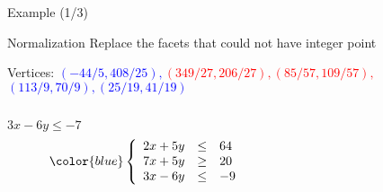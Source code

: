 \begin{frame}{Example (1/3)}
	\begin{block}{Normalization}
		Replace the facets that could not have integer point
		
		Vertices: \textcolor{blue}{$(-44/5,408/25),$}\sout{\textcolor{red}{$(349/27,206/27),$$(85/57,109/57),$}} \textcolor{blue}{$(113/9,70/9),$$(25/19,41/19)$}
		\begin{columns}
			\begin{column}{0.2\textwidth}
				\begin{center}
					\sout{\color{red}$3x - 6y \le -7$}
					\begin{equation*}
						\color{blue}
						\left\{   \begin{array}{crl}
							2x + 5y &\le& 64\\ 
							7x + 5y &\ge& 20\\
							3x - 6y &\le& -9
						\end{array}
						\right.
					\end{equation*}
					\smallskip
					
					
				\end{center}
				
			\end{column}
			\hfill
			\begin{column}{0.8\textwidth}
				\begin{center}
					
					\begin{figure}[H]
						\scalebox{.7}{}
					\end{figure}
					
				\end{center}
				
			\end{column}
		\end{columns}
		
	\end{block}
	
	
\end{frame}
